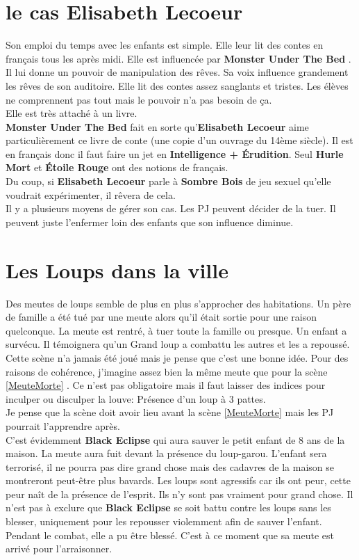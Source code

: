 \documentclass[oneside,12pt]{book}
\newcommand{\Lynn}{\textbf{Étoile Rouge} }
\newcommand{\Peter}{\textbf{Hurle Mort} }
\newcommand{\Leonard}{\textbf{Sombre Bois} }
\newcommand{\Monster}{\textbf{Monster Under The Bed} }
\newcommand{\BlackEclipse}{\textbf{Black Eclipse} }
\newcommand{\Elisabeth}{\textbf{Elisabeth Lecoeur} }
\begin{document}
\begin{flushleft}
\section{le cas \Elisabeth}
Son emploi du temps avec les enfants est simple. Elle leur lit des contes en français tous les après midi. Elle est influencée par \Monster . Il lui donne un pouvoir de manipulation des rêves. Sa voix influence grandement les rêves de son auditoire. Elle lit des contes assez sanglants et tristes. Les élèves ne comprennent pas tout mais le pouvoir n'a pas besoin de ça. \\ 
Elle est très attaché à un livre. \\ 
\Monster fait en sorte qu'\Elisabeth aime particulièrement ce livre de conte (une copie d'un ouvrage du 14ème siècle). Il est en français donc il faut faire un jet en \textbf{Intelligence + Érudition}. Seul \Peter et \Lynn ont des notions de français. \\

Du coup, si \Elisabeth parle à \Leonard de jeu sexuel qu'elle voudrait expérimenter, il rêvera de cela. \\

Il y a plusieurs moyens de gérer son cas. Les PJ peuvent décider de la tuer. Il peuvent juste l'enfermer loin des enfants que son influence diminue. \\ 

\section{Les Loups dans la ville}
Des meutes de loups semble de plus en plus s'approcher des habitations. 
Un père de famille a été tué par une meute alors qu'il était sortie pour une raison quelconque. 
La meute est rentré, à tuer toute la famille ou presque. Un enfant a survécu. Il témoignera qu'un Grand loup a combattu les autres et les a repoussé.\\
Cette scène n'a jamais été joué mais je pense que c'est une bonne idée. Pour des raisons de cohérence, j'imagine assez bien la même meute que pour la scène \ref{MeuteMorte} . Ce 
n'est pas obligatoire mais il faut laisser des indices pour inculper ou disculper la louve: Présence d'un loup à 3 pattes. \\ 
Je pense que la scène doit avoir lieu avant la scène \ref{MeuteMorte} mais les PJ pourrait l'apprendre après.  \\
C'est évidemment \BlackEclipse qui aura sauver le petit enfant de 8 ans de la maison. La meute aura fuit devant la présence du loup-garou. L'enfant sera terrorisé, il ne pourra pas dire grand chose mais des cadavres de la maison se montreront peut-être plus bavards. 
Les loups sont agressifs car ils ont peur, cette peur naît de la présence de l'esprit. Ils n'y sont pas vraiment pour grand chose. 
Il n'est pas à exclure que \BlackEclipse se soit battu contre les loups sans les blesser, uniquement pour les repousser violemment afin de sauver l'enfant. Pendant le combat, elle a pu être blessé. C'est à ce moment que sa meute est arrivé pour l'arraisonner. 




\end{flushleft}
\end{document}
